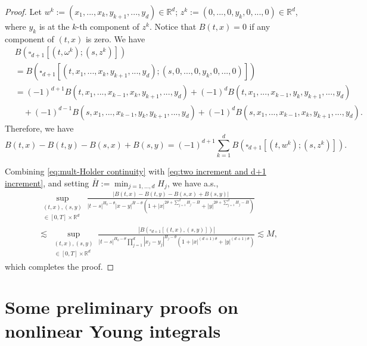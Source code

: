 \documentclass[11pt,reqno]{amsart}
\numberwithin{equation}{section}
\begin{document}
\begin{proof}
Let $ w^{k}:= (x_{1},...,x_{k},y_{k+1},...,y_{d})\in\mathbb{R}^{d}$; $z^{k}:= (0,...,0,y_{k},0,...,0)\in\mathbb{R}^{d}$, where $y_{k}$ is at the $k$-th component of $z^{k}$. 
Notice that $B(t,x) = 0$ if any component of $(t,x)$ is zero. We have
\begin{equation*}
\begin{aligned}
&B(\square_{d+1}[(t,\omega^{k});(s,z^{k})])\\
&= B(\square_{d+1}[(t,x_1,...,x_k,y_{k+1},...,y_d);(s,0,...,0,y_k,0,...,0)])\\
&=(-1)^{d+1} B(t,x_1,...,x_{k-1},x_k,y_{k+1},...,y_{d}) +  (-1)^{d} B(t,x_1,...,x_{k-1},y_{k},y_{k+1},...,y_{d}) \\
&\quad + (-1)^{d-1} B(s,x_1,...,x_{k-1},y_{k},y_{k+1},...,y_{d}) + (-1)^{d} B(s,x_1,...,x_{k-1},x_k,y_{k+1},...,y_{d}).
\end{aligned}
\end{equation*}
Therefore, we have
\begin{equation}\label{eq:two increment and d+1 increment}
B(t,x) - B(t,y) - B(s,x) + B(s,y) = (-1)^{d+1} \sum_{k=1}^{d} B(\square_{d+1}[(t,w^{k});(s,z^{k})]).
\end{equation}

Combining \eqref{eq:mult-Holder continuity} with \eqref{eq:two increment and d+1 increment}, and setting $\bar{H}:=\min_{j=1,...,d}H_{j}$, we have a.s.,
\begin{equation*}
\begin{aligned}
&\sup_{\substack{(t,x),(s,y)\\ \in[0,T]\times \mathbb{R}^{d}}}\frac{|B(t,x) - B(t,y) - B(s,x) + B(s,y)|}{|t-s|^{H_{0} - \theta}|x - y|^{\bar{H} - \theta}\left(1 + |x|^{2\theta + \sum_{j=1}^{d}H_{j} - \bar{H}} + |y|^{2\theta + \sum_{j=1}^{d}H_{j} - \bar{H}}\right)}\\
&\lesssim \sup_{\substack{(t,x),(s,y)\\ \in[0,T]\times \mathbb{R}^{d}}}\frac{|B(\square_{d+1}[(t,x),(s,y)])|}{|t-s|^{H_{0} - \theta}\prod\limits_{j=1}^{d}|x_{j}-y_{j}|^{H_{j} - \theta}\left(1 + |x|^{(d+1)\theta} + |y|^{(d+1)\theta}\right)} \lesssim M,
\end{aligned}
\end{equation*}
which completes  the proof.
\end{proof}


\section{Some preliminary proofs on nonlinear Young integrals}\label{append:B}
\end{document}
